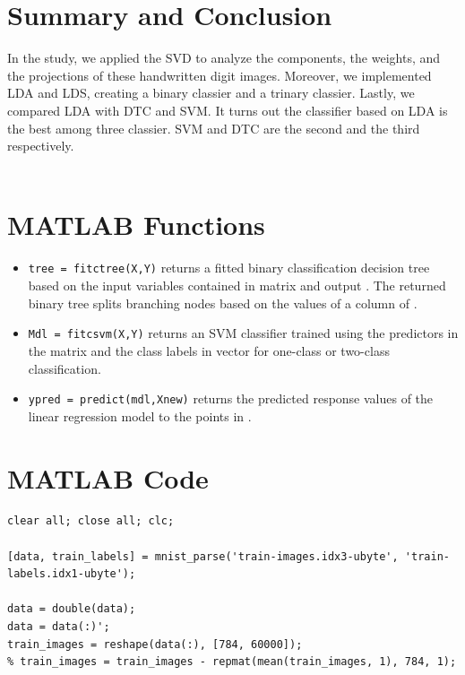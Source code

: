 \documentclass{article}
\begin{document}
\section{Summary and Conclusion}
In the study, we applied the SVD to analyze the components, the weights, and the projections of these handwritten digit images. Moreover, we implemented LDA and LDS, creating a binary classier and a trinary classier. Lastly, we compared LDA with DTC and SVM. It turns out the classifier based on LDA is the best among three classier. SVM and DTC are the second and the third respectively. \\
~\\
\begin{appendices}

\section{MATLAB Functions}
\begin{itemize}
    \item \texttt{tree = fitctree(X,Y)} returns a fitted binary classification decision tree based on the input variables contained in matrix  and output . The returned binary tree splits branching nodes based on the values of a column of .
    \item \texttt{Mdl = fitcsvm(X,Y)} returns an SVM classifier trained using the predictors in the matrix  and the class labels in vector  for one-class or two-class classification.
    \item \texttt{ypred = predict(mdl,Xnew)} returns the predicted response values of the linear regression model  to the points in .
\end{itemize}


\section{MATLAB Code}

\begin{verbatim}
clear all; close all; clc;

[data, train_labels] = mnist_parse('train-images.idx3-ubyte', 'train-labels.idx1-ubyte');

data = double(data);
data = data(:)';
train_images = reshape(data(:), [784, 60000]);
% train_images = train_images - repmat(mean(train_images, 1), 784, 1);



\end{verbatim}
\end{appendices}
\end{document}
